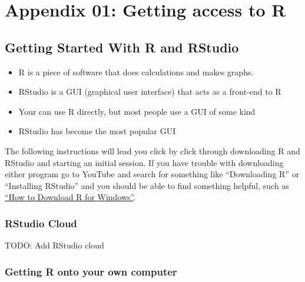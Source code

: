 \documentclass[
]{book}
\providecommand{\tightlist}{%
  \setlength{\itemsep}{0pt}\setlength{\parskip}{0pt}}
\begin{document}
\hypertarget{section}{%
\subsection*{}\label{section}}

\hypertarget{appendix-01-getting-access-to-r}{%
\chapter*{Appendix 01: Getting access to R}\label{appendix-01-getting-access-to-r}}

\hypertarget{getting-started-with-r-and-rstudio}{%
\section{Getting Started With R and RStudio}\label{getting-started-with-r-and-rstudio}}

\begin{itemize}
\tightlist
\item
  R is a piece of software that does calculations and makes graphs.
\item
  RStudio is a GUI (graphical user interface) that acts as a front-end to R
\item
  Your can use R directly, but most people use a GUI of some kind
\item
  RStudio has become the most popular GUI
\end{itemize}

The following instructions will lead you click by click through downloading R and RStudio and starting an initial session. If you have trouble with downloading either program go to YouTube and search for something like ``Downloading R'' or ``Installing RStudio'' and you should be able to find something helpful, such as \href{https://www.youtube.com/watch?v=GYdmkLgV9n8}{``How to Download R for Windows''}.

\hypertarget{rstudio-cloud}{%
\subsection{RStudio Cloud}\label{rstudio-cloud}}

TODO: Add RStudio cloud

\hypertarget{getting-r-onto-your-own-computer}{%
\subsection{Getting R onto your own computer}\label{getting-r-onto-your-own-computer}}
\end{document}
